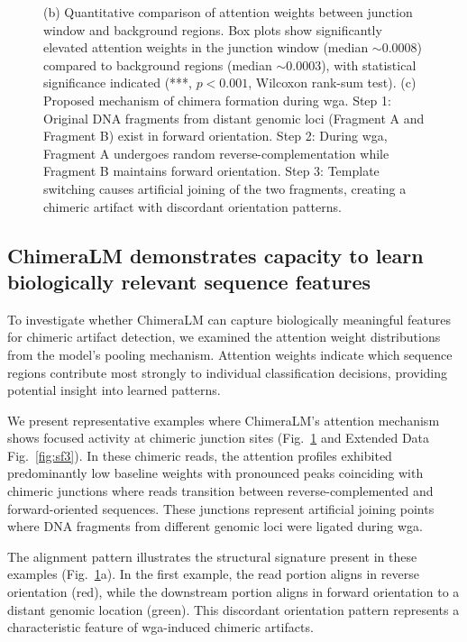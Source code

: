 \documentclass[pdflatex,sn-nature]{sn-jnl}%
\theoremstyle{thmstyleone}%
\theoremstyle{thmstyletwo}%
\theoremstyle{thmstylethree}%
\begin{document}
\begin{figure}[!ht]
{		(b) Quantitative comparison of attention weights between junction window and background regions. Box plots show significantly elevated attention weights in the junction window (median $\sim$0.0008) compared to background regions (median $\sim$0.0003), with statistical significance indicated (***, $p < 0.001$, Wilcoxon rank-sum test).
		(c) Proposed mechanism of chimera formation during \gls{wga}. Step 1: Original DNA fragments from distant genomic loci (Fragment A and Fragment B) exist in forward orientation. Step 2: During \gls{wga}, Fragment A undergoes random reverse-complementation while Fragment B maintains forward orientation. Step 3: Template switching causes artificial joining of the two fragments, creating a chimeric artifact with discordant orientation patterns.}\label{fig:figure4}
\end{figure}

\subsection*{ChimeraLM demonstrates capacity to learn biologically relevant sequence features}

To investigate whether ChimeraLM can capture biologically meaningful features for chimeric artifact detection, we examined the attention weight distributions from the model's pooling mechanism.
Attention weights indicate which sequence regions contribute most strongly to individual classification decisions, providing potential insight into learned patterns.

We present representative examples where ChimeraLM's attention mechanism shows focused activity at chimeric junction sites (Fig.~\ref{fig:figure4} and Extended Data Fig.~\ref{fig:sf3}).
In these chimeric reads, the attention profiles exhibited predominantly low baseline weights with pronounced peaks coinciding with chimeric junctions where reads transition between reverse-complemented and forward-oriented sequences.
These junctions represent artificial joining points where DNA fragments from different genomic loci were ligated during \gls{wga}.

The alignment pattern illustrates the structural signature present in these examples (Fig.~\ref{fig:figure4}a).
In the first example, the read portion aligns in reverse orientation (red), while the downstream portion aligns in forward orientation to a distant genomic location (green).
This discordant orientation pattern represents a characteristic feature of \gls{wga}-induced chimeric artifacts.
\end{document}
